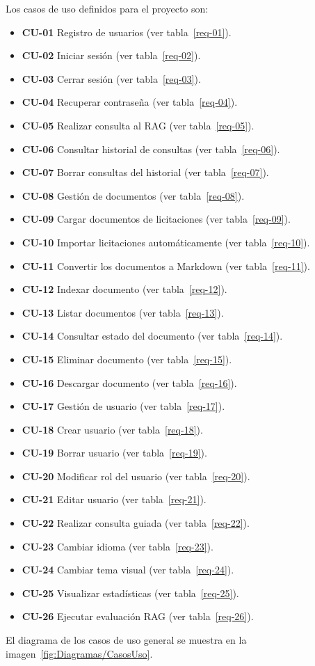 Los casos de uso definidos para el proyecto son:
\begin{itemize}
\tightlist
	\item \textbf{CU-01} Registro de usuarios (ver tabla~\ref{req-01}).
	\item \textbf{CU-02} Iniciar sesión (ver tabla~\ref{req-02}).
	\item \textbf{CU-03} Cerrar sesión (ver tabla~\ref{req-03}).
	\item \textbf{CU-04} Recuperar contraseña (ver tabla~\ref{req-04}).
	\item \textbf{CU-05} Realizar consulta al RAG (ver tabla~\ref{req-05}).
	\item \textbf{CU-06} Consultar historial de consultas (ver tabla~\ref{req-06}).
	\item \textbf{CU-07} Borrar consultas del historial (ver tabla~\ref{req-07}).
	\item \textbf{CU-08} Gestión de documentos (ver tabla~\ref{req-08}).
	\item \textbf{CU-09} Cargar documentos de licitaciones (ver tabla~\ref{req-09}).
	\item \textbf{CU-10} Importar licitaciones automáticamente (ver tabla~\ref{req-10}).
	\item \textbf{CU-11} Convertir los documentos a Markdown (ver tabla~\ref{req-11}).
	\item \textbf{CU-12} Indexar documento (ver tabla~\ref{req-12}).
	\item \textbf{CU-13} Listar documentos (ver tabla~\ref{req-13}).
	\item \textbf{CU-14} Consultar estado del documento (ver tabla~\ref{req-14}).
	\item \textbf{CU-15} Eliminar documento (ver tabla~\ref{req-15}).
	\item \textbf{CU-16} Descargar documento (ver tabla~\ref{req-16}).
	\item \textbf{CU-17} Gestión de usuario (ver tabla~\ref{req-17}).
	\item \textbf{CU-18} Crear usuario (ver tabla~\ref{req-18}).
	\item \textbf{CU-19} Borrar usuario (ver tabla~\ref{req-19}).
	\item \textbf{CU-20} Modificar rol del usuario (ver tabla~\ref{req-20}).
	\item \textbf{CU-21} Editar usuario (ver tabla~\ref{req-21}).
	\item \textbf{CU-22} Realizar consulta guiada (ver tabla~\ref{req-22}).
	\item \textbf{CU-23} Cambiar idioma (ver tabla~\ref{req-23}).
	\item \textbf{CU-24} Cambiar tema visual (ver tabla~\ref{req-24}).
	\item \textbf{CU-25} Visualizar estadísticas (ver tabla~\ref{req-25}).
	\item \textbf{CU-26} Ejecutar evaluación RAG (ver tabla~\ref{req-26}).
\end{itemize}
El diagrama de los casos de uso general se muestra en la imagen~\ref{fig:Diagramas/CasosUso}.

